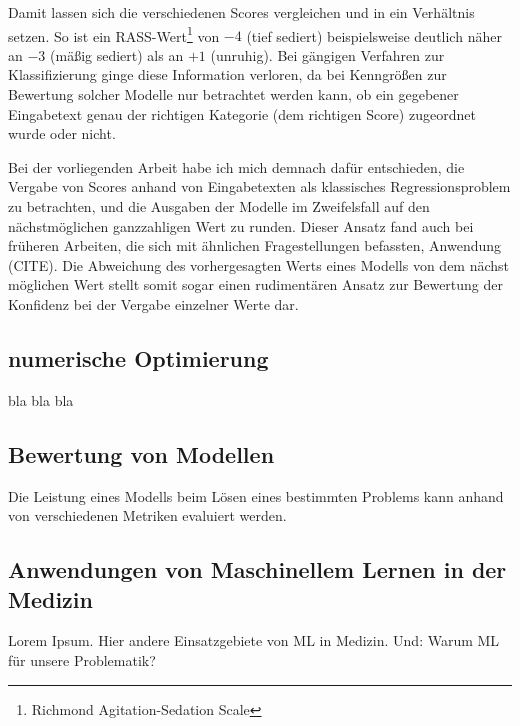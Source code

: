 Damit lassen sich die verschiedenen Scores vergleichen und in ein Verhältnis setzen. So ist ein RASS-Wert\footnote{Richmond Agitation-Sedation Scale} von $-4$ (tief sediert) beispielsweise deutlich näher an $-3$ (mäßig sediert) als an $+1$ (unruhig). Bei gängigen Verfahren zur Klassifizierung ginge diese Information verloren, da bei Kenngrößen zur Bewertung solcher Modelle nur betrachtet werden kann, ob ein gegebener Eingabetext genau der richtigen Kategorie (dem richtigen Score) zugeordnet wurde oder nicht. 

Bei der vorliegenden Arbeit habe ich mich demnach dafür entschieden, die Vergabe von Scores anhand von Eingabetexten als klassisches Regressionsproblem zu betrachten, und die Ausgaben der Modelle im Zweifelsfall auf den nächstmöglichen ganzzahligen Wert zu runden. Dieser Ansatz fand auch bei früheren Arbeiten, die sich mit ähnlichen Fragestellungen befassten, Anwendung (CITE). Die Abweichung des vorhergesagten Werts eines Modells von dem nächst möglichen Wert stellt somit sogar einen rudimentären Ansatz zur Bewertung der Konfidenz bei der Vergabe einzelner Werte dar.

\subsection{numerische Optimierung}
bla bla bla

\subsection{Bewertung von Modellen}
Die Leistung eines Modells beim Lösen eines bestimmten Problems kann anhand von verschiedenen Metriken evaluiert werden.

\subsection{Anwendungen von Maschinellem Lernen in der Medizin}
Lorem Ipsum. Hier andere Einsatzgebiete von ML in Medizin. Und: Warum ML für unsere Problematik?